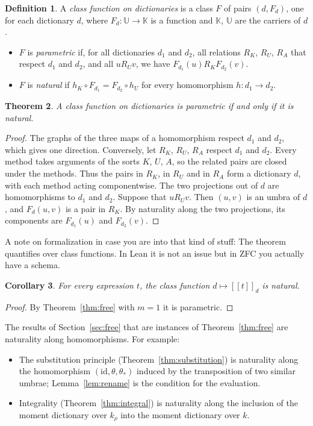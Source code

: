 \documentclass[11pt,a4paper]{report}
\theoremstyle{plain}
\newtheorem{theorem}{Theorem}[chapter]
\newtheorem{corollary}[theorem]{Corollary}
\theoremstyle{definition}
\newtheorem{definition}[theorem]{Definition}
\theoremstyle{remark}
\newcommand{\sK}{\mathbb{K}}
\newcommand{\sU}{\mathbb{U}}
\newcommand{\den}[2]{[\![#1]\!]_{#2}}
\begin{document}
\begin{definition}
\label{def:natural}
A \emph{class function on dictionaries} is a class $F$ of pairs $(d, F_d)$, one
for each dictionary $d$, where $F_d : \sU \to \sK$ is a function and $\sK$, $\sU$
are the carriers of $d$.
\begin{itemize}
\item $F$ is \emph{parametric} if, for all dictionaries $d_1$ and $d_2$, all
  relations $R_K$, $R_U$, $R_A$ that respect $d_1$ and $d_2$, and all
  $u \mathrel{R_U} v$, we have $F_{d_1}(u) \mathrel{R_K} F_{d_2}(v)$.
\item $F$ is \emph{natural} if $h_K \circ F_{d_1} = F_{d_2} \circ h_U$ for every
  homomorphism $h : d_1 \to d_2$.
\end{itemize}
\end{definition}

\begin{theorem}
\label{thm:natural}
A class function on dictionaries is parametric if and only if it is natural.
\end{theorem}

\begin{proof}
The graphs of the three maps of a homomorphism respect $d_1$ and $d_2$, which
gives one direction. Conversely, let $R_K$, $R_U$, $R_A$ respect $d_1$ and
$d_2$. Every method
takes arguments of the sorts $K$, $U$, $A$, so the related pairs are closed under
the methods. Thus the pairs in $R_K$, in $R_U$ and in $R_A$ form a dictionary $d$,
with each method acting componentwise. The two projections out of $d$ are
homomorphisms to $d_1$ and $d_2$. Suppose that $u \mathrel{R_U} v$. Then $(u, v)$
is an umbra of $d$, and $F_d(u, v)$ is a pair in $R_K$. By naturality along the
two projections, its components are $F_{d_1}(u)$ and $F_{d_2}(v)$.
\end{proof}

A note on formalization in case you are into that kind of stuff: The theorem
quantifies over class functions. In Lean it is not an issue but in ZFC you actually have a schema.

\begin{corollary}
\label{cor:natural}
For every expression $t$, the class function $d \mapsto \den{t}{d}$ is natural.
\end{corollary}

\begin{proof}
By Theorem~\ref{thm:free} with $m = 1$ it is parametric.
\end{proof}

The results of Section~\ref{sec:free} that are instances of
Theorem~\ref{thm:free} are naturality along homomorphisms. For example:
\begin{itemize}
\item The substitution principle (Theorem~\ref{thm:substitution}) is naturality along the homomorphism
  $(\mathrm{id}, \theta, \theta_*)$ induced by the transposition of two similar
  umbrae; Lemma~\ref{lem:rename} is the condition for the evaluation.
\item Integrality (Theorem~\ref{thm:integral}) is naturality along the inclusion of the moment dictionary over
  $k_\rho$ into the moment dictionary over $k$.
\end{itemize}
\end{document}
